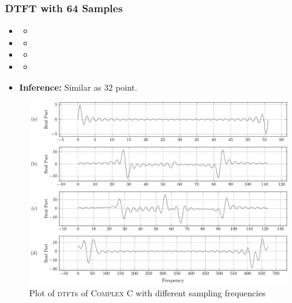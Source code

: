 \documentclass[../../course]{subfiles}
\begin{document}
\subsubsection{DTFT with 64 Samples}

\begin{itemize} [label=]

    \item \sampFreqMuchLess
        \begin{itemize} [label=]
            \item
        \end{itemize}

    \item \sampFreqNorm
        \begin{itemize} [label=]
            \item
        \end{itemize}

    \item \sampFreqSligGreat
        \begin{itemize} [label=]
            \item
        \end{itemize}

    \item \sampFreqMuchGreat
        \begin{itemize} [label=]
            \item
        \end{itemize}

    \item \textbf{Inference:} Similar as $32$ point.

\end{itemize}


\vfill

\begin{figure} [H]
    \centering
     {
        \includegraphics[height = 0.8\textheight] {tikzpics/plotDtftComplexC64.pdf}
    }
     {Plot of \textsc{dtft}s of \textsc{Complex C} with different sampling frequencies}
    \label{plt:dtftCplxC64}
\end{figure}
\end{document}
